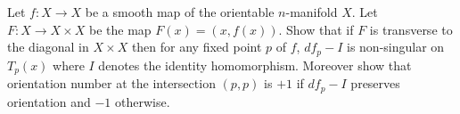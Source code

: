 Let $f:X\rightarrow X$ be a smooth map of the orientable $n$-manifold
$X$. Let $F:X\rightarrow X\times X$ be the map $F(x)=(x,f(x))$. Show
that if $F$ is transverse to the diagonal in $X\times X$ then for any
fixed point $p$ of $f$, $df_p-I$ is non-singular on $T_p(x)$ where $I$
denotes the identity homomorphism. Moreover show that orientation
number at the intersection $(p,p)$ is $+1$ if $df_p-I$ preserves
orientation and $-1$ otherwise.

